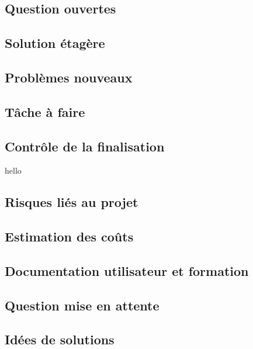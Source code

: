 		\subsection{Question ouvertes}
		
		\subsection{Solution étagère}
		
		\subsection{Problèmes nouveaux}
		
		\subsection{Tâche à faire}
		
		\subsection{Contrôle de la finalisation}
			hello
		\subsection{Risques liés au projet}
		
		\subsection{Estimation des coûts}
		
		\subsection{Documentation utilisateur et formation}
		
		\subsection{Question mise en attente}
		
		\subsection{Idées de solutions}
		

